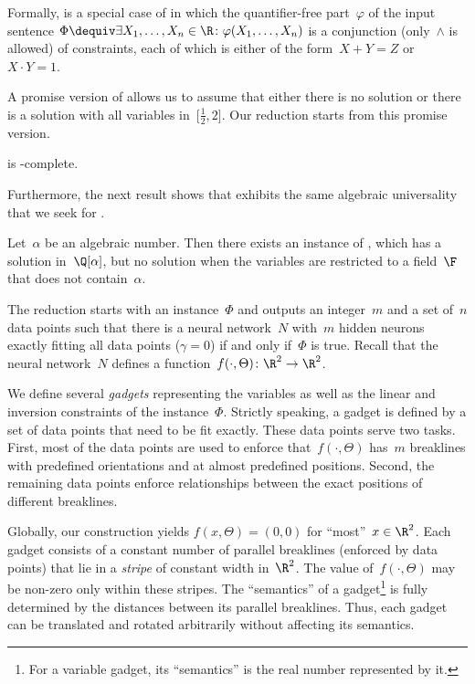 Formally, \ETRINV is a special case of \ETR in which the quantifier-free part~$\varphi$ of the input sentence \(
    \Phi \dequiv
    \exists X_1, \ldots, X_n \in \R \colon
    \varphi(X_1, \ldots, X_n)
\) is a conjunction (only~$\land$ is allowed) of constraints, each of which is either of the form~$X + Y = Z$ or~$X \cdot Y = 1$.

A promise version of \ETRINV allows us to assume that
%
either there is no solution or there is a solution  %
with all variables in~$\bigl[\frac{1}{2},2\bigr]$.
%
%
%
%
Our reduction starts from this promise version.


\begin{theorem}
    \label{thm:ETRINV}
    \ETRINV is \ER-complete.
\end{theorem}

Furthermore, 
the next result shows that %
\ETRINV exhibits the same algebraic universality that we seek
for \trainNN. %

\begin{theorem}
    \label{thm:ETRINV_universality}
    Let~$\alpha$ be an algebraic number.
    Then there exists an instance of \ETRINV, which has a solution in~$\Q[\alpha]$, but no solution when the variables are restricted to a field~$\F$ that does not contain~$\alpha$.
\end{theorem}

The reduction starts with an \ETRINV instance~$\Phi$ and outputs an integer~$m$ and a set of~$n$ data points such that there is a \fullyconnected \twolayer \ReLU neural network~$N$ with~$m$ hidden neurons exactly fitting all data points ($\gamma = 0$) if and only if~$\Phi$ is true.
Recall that the neural network~$N$ defines a \CPWL function~$f(\cdot, \Theta) \colon \R^2 \to \R^2$.

We define several \emph{gadgets} representing the variables as well as the linear and inversion constraints of the \ETRINV instance~$\Phi$.
Strictly speaking, a gadget is defined by a set of data points that need to be fit exactly.
These data points serve two tasks. %
%
%
First,  %
most of the data points are used to enforce that~$f(\cdot, \Theta)$ has~$m$ breaklines
with predefined orientations and at almost predefined positions.
%
Second,  %
the remaining data points enforce relationships between the exact positions of different
breaklines.

Globally, our construction yields $f(x, \Theta) = (0,0)$ for \enquote{most}~$x \in \R^2$.
Each gadget consists of a constant number of parallel breaklines (enforced by data points)
that lie in a \emph{stripe} of constant width in~$\R^2$.
The value of~$f(\cdot, \Theta)$ may be non-zero only within these stripes.
The \enquote{semantics} of a gadget\footnote{
For a variable gadget, its \enquote{semantics} is the real number represented by it.} 
is fully determined by the distances between its parallel breaklines.
Thus, each gadget can be translated and rotated arbitrarily without affecting its semantics.

